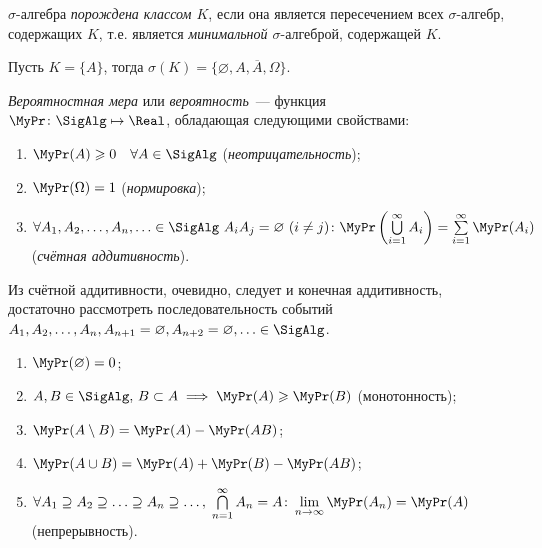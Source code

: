 \hypertarget{generated_sigma}{}
\begin{defn}
	$\sigma \text{-алгебра}$ \textit{порождена классом $K$}, если она является пересечением всех $\sigma \text{-алгебр}$, содержащих $K$, т.е. является \textit{минимальной $\sigma \text{-алгеброй}$}, содержащей $K$.
\end{defn}

\begin{exmp}
	Пусть $K = \{A\}$, тогда $\sigma (K) = \{\varnothing, A, \overline{A}, \Omega\}$.
\end{exmp}

\begin{defn}
	\textit{Вероятностная мера} или \textit{вероятность}~--- функция \\
	${\MyPr\colon \SigAlg \mapsto \Real}$, обладающая следующими свойствами:
	
	\begin{enumerate}
		\item 
		      $\MyPr(A) \geqslant 0 \quad \forall A \in \SigAlg$ (\textit{неотрицательность});
		\item 
		      $\MyPr(\Omega) = 1$ (\textit{нормировка});
		\item 
		      $\forall A_1, A_2, \ldots, A_n, \ldots \in \SigAlg~ A_{i}A_{j} = \varnothing~ (i \ne j) \colon \MyPr\left( \bigcup\limits_{i=1}^\infty A_i \right) = \sum\limits_{i=1}^\infty \MyPr(A_i)$ \\
		      (\textit{счётная аддитивность}).
	\end{enumerate}
\end{defn}

\begin{rmrk}
	Из счётной аддитивности, очевидно, следует и конечная аддитивность, достаточно рассмотреть последовательность событий $A_1, A_2, \ldots, A_n, A_{n+1}=\varnothing, A_{n+2}=\varnothing,\ldots \in \SigAlg$.
\end{rmrk}
\begin{namedthm}\leavevmode
	\begin{enumerate}
		\item 
		      $\MyPr(\varnothing)=0$;
		\item 
		      $A, B \in \SigAlg, \, B \subset A \implies \MyPr(A) \geqslant \MyPr(B)$ (монотонность);
		\item 
		      $\MyPr(A \setminus B) = \MyPr(A) - \MyPr(AB)$;
		\item 
		      $\MyPr(A \cup B) = \MyPr(A) + \MyPr(B) - \MyPr(AB)$;
		\item 
		      $\forall A_1 \supseteq A_2 \supseteq \ldots \supseteq A_n \supseteq \ldots, \; \bigcap\limits_{n = 1}^{\infty} A_n = A \colon \lim\limits_{n \to \infty}\MyPr(A_n) = \MyPr(A)$ \\
		      (непрерывность).
	\end{enumerate}
\end{namedthm}

